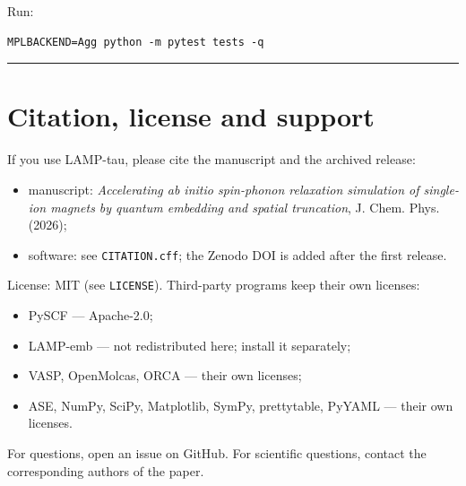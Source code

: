 \documentclass[11pt,a4paper]{article}
\providecommand{\tightlist}{%
  \setlength{\itemsep}{0pt}\setlength{\parskip}{0pt}}
\begin{document}
Run:

\begin{lstlisting}
MPLBACKEND=Agg python -m pytest tests -q
\end{lstlisting}

\begin{center}\rule{0.5\linewidth}{0.4pt}\end{center}

\section{Citation, license and
support}\label{citation-license-and-support}

If you use LAMP-tau, please cite the manuscript and the archived
release:

\begin{itemize}
\tightlist
\item
  manuscript: \emph{Accelerating ab initio spin-phonon relaxation
  simulation of single-ion magnets by quantum embedding and spatial
  truncation}, J. Chem. Phys. (2026);
\item
  software: see \texttt{CITATION.cff}; the Zenodo DOI is added after the
  first release.
\end{itemize}

License: MIT (see \texttt{LICENSE}). Third-party programs keep their own
licenses:

\begin{itemize}
\tightlist
\item
  PySCF --- Apache-2.0;
\item
  LAMP-emb --- not redistributed here; install it separately;
\item
  VASP, OpenMolcas, ORCA --- their own licenses;
\item
  ASE, NumPy, SciPy, Matplotlib, SymPy, prettytable, PyYAML --- their
  own licenses.
\end{itemize}

For questions, open an issue on GitHub. For scientific questions,
contact the corresponding authors of the paper.
\end{document}
